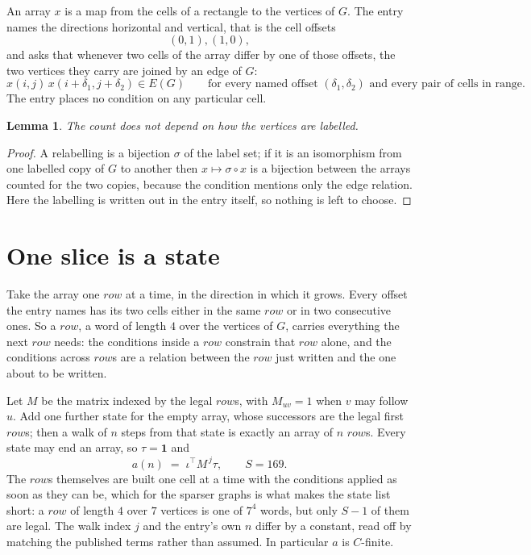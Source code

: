 \documentclass[11pt,a4paper]{article}
\theoremstyle{plain}
\newtheorem{lemma}[theorem]{Lemma}
\theoremstyle{definition}
\begin{document}
An array $x$ is a map from the cells of a rectangle to the vertices of $G$. The entry names the
directions horizontal and vertical, that is the cell offsets
\[
(0,1), (1,0),
\]
and asks that whenever two cells of the array differ by one of those offsets, the two vertices
they carry are joined by an edge of $G$:
\[
x(i,j)\,x(i+\delta_1,j+\delta_2)\in E(G)\qquad
\text{for every named offset } (\delta_1,\delta_2)\text{ and every pair of cells in range.}
\]
The entry places no condition on any particular cell.

\begin{lemma}\label{lem:label}
The count does not depend on how the vertices are labelled.
\end{lemma}

\begin{proof}
A relabelling is a bijection $\sigma$ of the label set; if it is an isomorphism from one
labelled copy of $G$ to another then $x\mapsto\sigma\circ x$ is a bijection between the arrays
counted for the two copies, because the condition mentions only the edge relation.
Here the labelling is written out in the entry itself, so nothing is left to choose.
\end{proof}

\section{One slice is a state}

Take the array one $row$ at a time, in the direction in which it grows.
Every offset the entry names has its two cells either in the same $row$ or in two
consecutive ones. So a $row$, a word of length $4$ over the vertices of $G$, carries
everything the next $row$ needs: the conditions inside a $row$ constrain that
$row$ alone, and the conditions across $row$s are a relation between the
$row$ just written and the one about to be written.

Let $M$ be the matrix indexed by the legal $row$s, with $M_{uv}=1$ when $v$ may
follow $u$. Add one further state for the empty array, whose successors are the legal first
$row$s; then a walk of
$n$ steps from that state is exactly an array of $n$ $row$s. Every state may end an
array, so $\tau=\mathbf{1}$ and
\[
a(n)\;=\;\iota^{\!\top}M^{\,j}\tau ,\qquad S=169.
\]
The $row$s themselves are built one cell at a time with the conditions applied as soon
as they can be, which for the sparser graphs is what makes the state list short: a $row$
of length $4$ over $7$ vertices is one of $7^{4}$ words, but only $S-1$ of them are
legal. The walk index $j$ and the entry's own $n$ differ by a constant, read off by matching the
published terms rather than assumed. In particular $a$ is $C$-finite.
\end{document}
